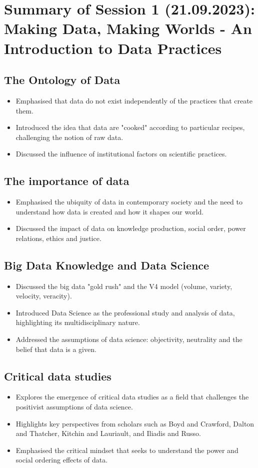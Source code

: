 \documentclass{article}
\begin{document}
\section*{Summary of Session 1 (21.09.2023): Making Data, Making Worlds - An Introduction to Data Practices}

\subsection*{The Ontology of Data}
\begin{itemize}
  \item Emphasised that data do not exist independently of the practices that create them.
  \item Introduced the idea that data are "cooked" according to particular recipes, challenging the notion of raw data.
  \item Discussed the influence of institutional factors on scientific practices.
\end{itemize}

\subsection*{The importance of data}
\begin{itemize}
  \item Emphasised the ubiquity of data in contemporary society and the need to understand how data is created and how it shapes our world.
  \item Discussed the impact of data on knowledge production, social order, power relations, ethics and justice.
\end{itemize}

\subsection*{Big Data Knowledge and Data Science}
\begin{itemize}
  \item Discussed the big data "gold rush" and the V4 model (volume, variety, velocity, veracity).
  \item Introduced Data Science as the professional study and analysis of data, highlighting its multidisciplinary nature.
  \item Addressed the assumptions of data science: objectivity, neutrality and the belief that data is a given.
\end{itemize}
\subsection*{Critical data studies}
\begin{itemize}  \item Explores the emergence of critical data studies as a field that challenges the positivist assumptions of data science.
  \item Highlights key perspectives from scholars such as Boyd and Crawford, Dalton and Thatcher, Kitchin and Lauriault, and Iliadis and Russo.
  \item Emphasised the critical mindset that seeks to understand the power and social ordering effects of data.
\end{itemize}
\end{document}
